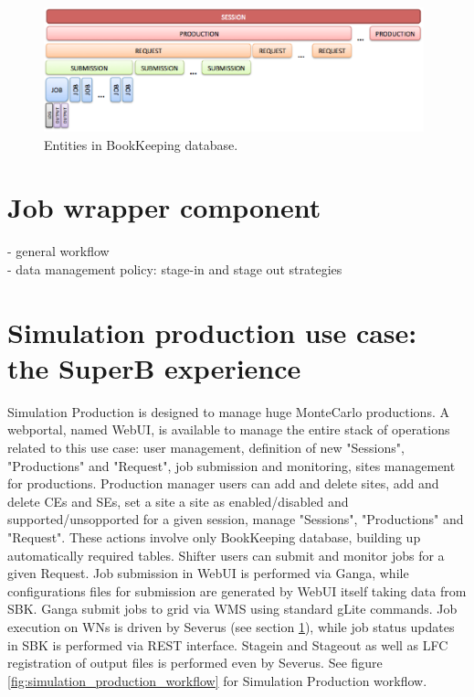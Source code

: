 \documentclass[a4paper]{jpconf}
\begin{document}
\begin{figure}[h]
\includegraphics[width=26pc]{img/BK_entities.eps}\hspace{2pc}%
\caption{\label{fig:BK_entities}Entities in BookKeeping database.}
\end{figure}
 
\section{Job wrapper component}
\label{sec:severus}
- general workflow\\
- data management policy: stage-in and stage out strategies\\
 
\section{Simulation production use case: the SuperB experience}
Simulation Production is designed to manage huge MonteCarlo productions.
A webportal, named WebUI\cite{ref:webui}, is available to manage the entire stack of operations related to this use case: user management, definition of new "Sessions", "Productions" and "Request", job submission and monitoring, sites management for productions. 
Production manager users can add and delete sites, add and delete CEs and SEs, set a site a site as enabled/disabled and supported/unsopported for a given session, manage "Sessions", "Productions" and "Request". These actions involve only BookKeeping database, building up automatically required tables.
Shifter users can submit and monitor jobs for a given Request. Job submission in WebUI is performed via Ganga\cite{ref:ganga}, while configurations files for submission are generated by WebUI itself taking data from SBK. Ganga submit jobs to grid via WMS using standard gLite commands. Job execution on WNs is driven by Severus (see section \ref{sec:severus}), while job status updates in SBK is performed via REST interface. Stagein and Stageout as well as LFC registration of output files is performed even by Severus. See figure \ref{fig:simulation_production_workflow} for Simulation Production workflow.\\
\end{document}
